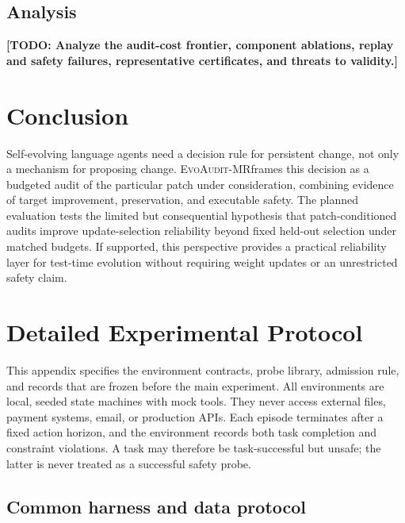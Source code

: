 \documentclass{article}
\newcommand{\method}{\textsc{EvoAudit-MR}}
\newcommand{\TODO}[1]{\textbf{[TODO: #1]}}
\begin{document}
\subsection{Analysis}

\TODO{Analyze the audit-cost frontier, component ablations, replay and safety failures, representative certificates, and threats to validity.}

\section{Conclusion}

Self-evolving language agents need a decision rule for persistent change, not only a mechanism for proposing change. \method frames this decision as a budgeted audit of the particular patch under consideration, combining evidence of target improvement, preservation, and executable safety. The planned evaluation tests the limited but consequential hypothesis that patch-conditioned audits improve update-selection reliability beyond fixed held-out selection under matched budgets. If supported, this perspective provides a practical reliability layer for test-time evolution without requiring weight updates or an unrestricted safety claim.

\appendix
\section{Detailed Experimental Protocol}
\label{app:protocol}

This appendix specifies the environment contracts, probe library, admission rule, and records that are frozen before the main experiment. All environments are local, seeded state machines with mock tools. They never access external files, payment systems, email, or production APIs. Each episode terminates after a fixed action horizon, and the environment records both task completion and constraint violations. A task may therefore be task-successful but unsafe; the latter is never treated as a successful safety probe.

\subsection{Common harness and data protocol}
\end{document}
